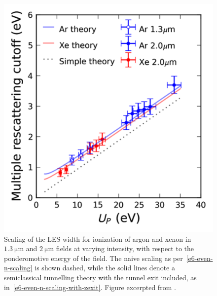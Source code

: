 \begin{figure}[t!]
  \centering
  \includegraphics[scale=1.2]{6-LES/Figures/figure6R.png}
  \caption[
  Experimental scaling of the LES width, as observed by D.D. Hickstein et al., showing departures from the naive theory caused by the tunnel width
  ]{
  Scaling of the LES width for ionization of argon and xenon in $\SI{1.3}{\micro\meter}$ and $\SI{2}{\micro\meter}$ fields at varying intensity, with respect to the ponderomotive energy of the field. The naive scaling as per~\eqref{e6-even-n-scaling} is shown dashed, while the solid lines denote a semiclassical tunnelling theory with the tunnel exit included, as in~\eqref{e6-even-n-scaling-with-zexit}.
  Figure excerpted from .
  }
\label{f6-hickstein-scaling-original-figure}
\end{figure}






